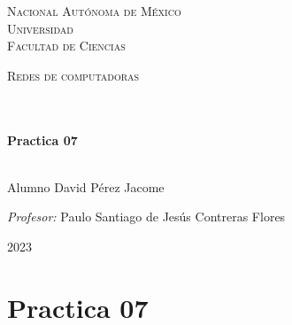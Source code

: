\documentclass[14pt]{book}
\begin{document}
\begin{center}
\begin{minipage}{0.48\textwidth}
\begin{flushright}
    \end{flushright}
  \end{minipage}
  \vspace*{-1.5cm}
  \textsc{\huge Nacional Autónoma de México \\ \vspace{-4px} Universidad }\\[2cm]
  \textsc{\LARGE Facultad de Ciencias}\\[1.5cm]
  \begin{minipage}{0.9\textwidth}
    \begin{center}
      \textsc{\LARGE Redes de computadoras}
    \end{center}
  \end{minipage}\\[0.5cm]
  \vspace*{1cm}
  \HRule \\[0.4cm]
  { \huge \bfseries Practica 07}\\[0.4cm]
  \HRule \\[1.5cm]
  \begin{minipage}{0.52\textwidth}
    \begin{flushleft} \large \small \vspace{-0.6cm} \vspace{-0.6cm}
      Alumno David Pérez Jacome \\
    \end{flushleft}
  \end{minipage}
  \begin{minipage}{0.46\textwidth}
    \vspace{-0.6cm}
    \begin{flushright} \large \small \emph{Profesor:}
      Paulo Santiago de Jesús Contreras Flores \\
    \end{flushright}
  \end{minipage}
  \vspace*{1cm}
  \vspace{2cm}
  \begin{center}
    {\large 2023}
  \end{center}
\end{center}
\newpage

{\color{blue} \section*{\textbf{Practica 07}}}
\vspace{1em}
\end{document}
